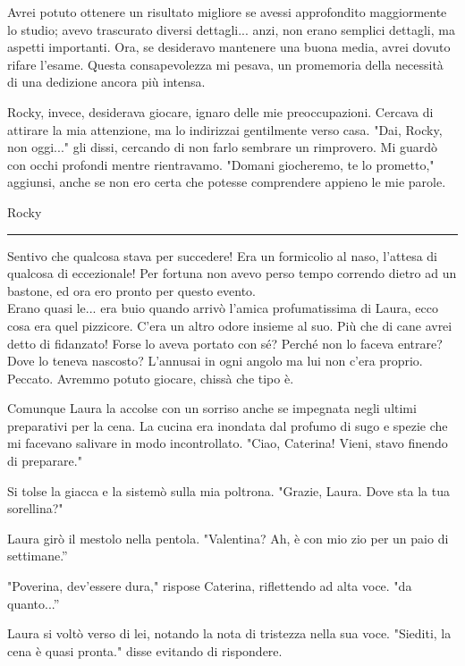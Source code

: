 Avrei potuto ottenere un risultato migliore se avessi approfondito maggiormente lo studio; avevo trascurato diversi dettagli... anzi, non erano semplici dettagli, ma aspetti importanti. Ora, se desideravo mantenere una buona media, avrei dovuto rifare l'esame. Questa consapevolezza mi pesava, un promemoria della necessità di una dedizione ancora più intensa.

Rocky, invece, desiderava giocare, ignaro delle mie preoccupazioni. Cercava di attirare la mia attenzione, ma lo indirizzai gentilmente verso casa. "Dai, Rocky, non oggi..." gli dissi, cercando di non farlo sembrare un rimprovero. Mi guardò con occhi profondi mentre rientravamo. "Domani giocheremo, te lo prometto," aggiunsi, anche se non ero certa che potesse comprendere appieno le mie parole.

\vspace{1em}
\begin{center}Rocky\end{center}
\hrule
\vspace{1em}

Sentivo che qualcosa stava per succedere! Era un formicolio al naso, l'attesa di qualcosa di eccezionale! Per fortuna non avevo perso tempo correndo dietro ad un bastone, ed ora ero pronto per questo evento.\\ 
Erano quasi le... era buio quando arrivò l'amica profumatissima di Laura, ecco cosa era quel pizzicore. C'era un altro odore insieme al suo. Più che di cane avrei detto di fidanzato!
Forse lo aveva portato con sé? Perché non lo faceva entrare? Dove lo teneva nascosto?
L'annusai in ogni angolo ma lui non c'era proprio. Peccato. Avremmo potuto giocare, chissà che tipo è.

Comunque Laura la accolse con un sorriso anche se impegnata negli ultimi preparativi per la cena. La cucina era inondata dal profumo di sugo e spezie che mi facevano salivare in modo incontrollato. "Ciao, Caterina! Vieni, stavo finendo di preparare."

Si tolse la giacca e la sistemò sulla mia poltrona. "Grazie, Laura. Dove sta la tua sorellina?"

Laura girò il mestolo nella pentola. "Valentina? Ah, è con mio zio per un paio di settimane.''

"Poverina, dev'essere dura," rispose Caterina, riflettendo ad alta voce. "da quanto...''

Laura si voltò verso di lei, notando la nota di tristezza nella sua voce.  "Siediti, la cena è quasi pronta." disse evitando di rispondere.

